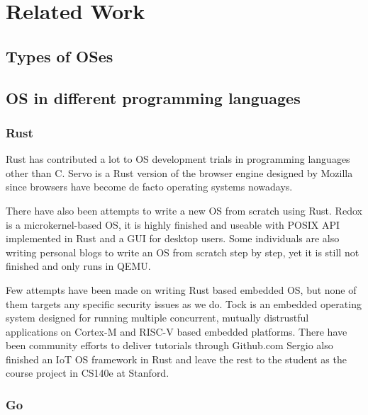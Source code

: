 \section{Related Work}

\subsection{Types of OSes}


\subsection{OS in different programming languages}

\subsubsection{Rust}
Rust has contributed a lot to OS development trials in programming languages other than C.
Servo\cite{Servo} is a Rust version of the browser engine designed by Mozilla since browsers have become de facto operating systems nowadays.

There have also been attempts to write a new OS from scratch using Rust.
Redox\cite{Redox} is a microkernel-based OS, it is highly finished and useable with POSIX API implemented in Rust and a GUI for desktop users.
Some individuals are also writing personal blogs\cite{OsPhil} to write an OS from scratch step by step, yet it is still not finished and only runs in QEMU. 

Few attempts have been made on writing Rust based embedded OS, but none of them targets any specific security issues as we do.
Tock\cite{levy2015ownership, levy2017tock, levy2017multiprogramming} is an embedded operating system designed for running multiple concurrent, mutually distrustful applications on Cortex-M and RISC-V based embedded platforms.
There have been community efforts to deliver tutorials through Github.com\cite{rpi-os-t0, rpi-os-t1}
Sergio also finished an IoT OS framework in Rust\cite{cs140e} and leave the rest to the student as the course project in CS140e at Stanford.

\subsubsection{Go}

